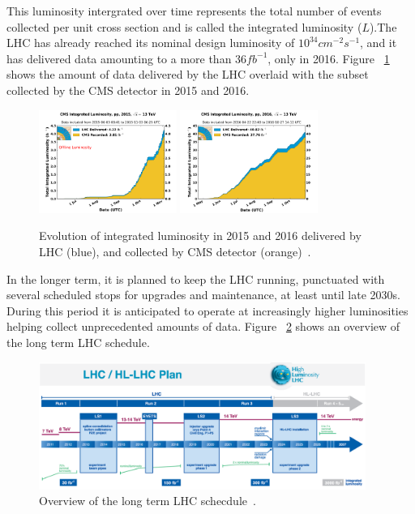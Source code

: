 This luminosity intergrated over time represents the total number of events collected per unit cross section and is called the integrated luminosity ($L$).The LHC has already reached its nominal design luminosity of $10^{34} cm^{-2}s^{-1}$, and it has delivered data amounting to a more than $36 fb^{-1}$, only in 2016. Figure ~\ref{fig:cms_int_lumi} shows the amount of data delivered by the LHC overlaid with the subset collected by the CMS detector in 2015 and 2016.
\begin{figure}
\begin{center}
  \includegraphics[width=0.4\textwidth,keepaspectratio]{plots_and_figures/chapter3/int_lumi_per_day_cumulative_pp_2015.png}
  \includegraphics[width=0.4\textwidth,keepaspectratio]{plots_and_figures/chapter3/int_lumi_per_day_cumulative_pp_2016.png}
\caption{Evolution of integrated luminosity in 2015 and 2016 delivered by LHC (blue), and collected by CMS detector (orange)~\cite{cms_int_lumi_ref}.}
\label{fig:cms_int_lumi}
\end{center}
\end{figure}



In the longer term, it is planned to keep the LHC running, punctuated with several scheduled stops for upgrades and maintenance, at least until late 2030s. During this period it is anticipated to operate at increasingly higher luminosities helping collect unprecedented amounts of data. Figure ~\ref{fig:lhc_schedule} shows an overview of the long term LHC schedule. 
\begin{figure}
\begin{center}
  \includegraphics[width=0.95\textwidth,keepaspectratio]{plots_and_figures/chapter3/lhc_schedule.png}
\caption{Overview of the long term LHC schecdule~\cite{LHC_plan_ref}.}
\label{fig:lhc_schedule}
\end{center}
\end{figure}


